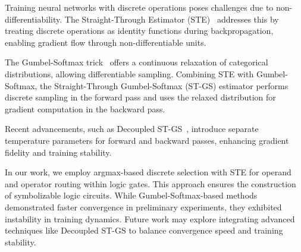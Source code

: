 Training neural networks with discrete operations poses challenges due to non-differentiability. The Straight-Through Estimator (STE)~\cite{bengio2013estimating} addresses this by treating discrete operations as identity functions during backpropagation, enabling gradient flow through non-differentiable units.

The Gumbel-Softmax trick~\cite{jang2016categorical, maddison2016concrete} offers a continuous relaxation of categorical distributions, allowing differentiable sampling. Combining STE with Gumbel-Softmax, the Straight-Through Gumbel-Softmax (ST-GS) estimator performs discrete sampling in the forward pass and uses the relaxed distribution for gradient computation in the backward pass.

Recent advancements, such as Decoupled ST-GS~\cite{shah2024improving}, introduce separate temperature parameters for forward and backward passes, enhancing gradient fidelity and training stability.

In our work, we employ argmax-based discrete selection with STE for operand and operator routing within logic gates. This approach ensures the construction of symbolizable logic circuits. While Gumbel-Softmax-based methods demonstrated faster convergence in preliminary experiments, they exhibited instability in training dynamics. Future work may explore integrating advanced techniques like Decoupled ST-GS to balance convergence speed and training stability.
